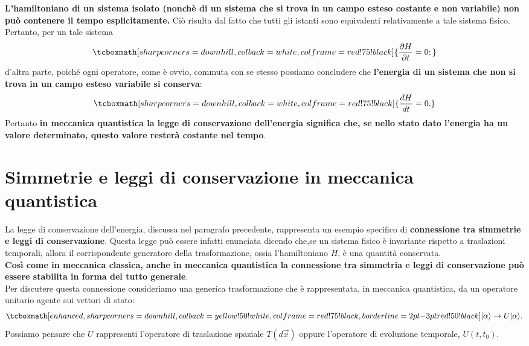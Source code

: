 \documentclass[a4paper,12pt,oneside]{book}
\begin{document}
\textbf{L'hamiltoniano di un sistema isolato (nonchè di un sistema che si trova in un campo esteso costante e non variabile) non può contenere il tempo esplicitamente.} Ciò risulta dal fatto che tutti gli istanti sono equivalenti relativamente a tale sistema fisico. Pertanto, per un tale sistema  
	\begin{equation}
		\tcboxmath[sharp corners=downhill, colback=white, colframe=red!75!black]{
			\frac{\partial H}{\partial{t}}=0;
			}
	\end{equation}
d'altra parte, poiché ogni operatore, come è ovvio, commuta con se stesso possiamo concludere che \textbf{l'energia di un sistema che non si trova in un campo esteso variabile si conserva}:
	\begin{equation}
		\tcboxmath[sharp corners=downhill, colback=white, colframe=red!75!black]{
			\frac{dH}{dt}=0.
			}
	\end{equation}
Pertanto \textbf{in meccanica quantistica la legge di conservazione dell'energia significa che, se nello stato dato l'energia ha un valore determinato, questo valore resterà costante nel tempo}.

\section[Simmetrie e leggi di conservazione  in meccanica quantistica]{Simmetrie e leggi di conservazione  in meccanica \\quantistica} 

La legge di conservazione dell'energia, discussa nel paragrafo precedente, rappresenta un esempio specifico di \textbf{connessione tra simmetrie e leggi di conservazione}. Questa legge può essere infatti enunciata dicendo che,se un sistema fisico è invariante rispetto a traslazioni temporali, allora il corrispondente generatore della trasformazione, ossia l'hamiltoniano $H$, è una quantità conservata.\\

\textbf{Così come in meccanica classica, anche in meccanica quantistica la connessione tra simmetria e leggi di conservazione può essere stabilita in forma del tutto generale}.\\

Per discutere questa connessione consideriamo una generica trasformazione che è rappresentata, in meccanica quantistica, da un operatore unitario agente sui vettori di stato:
	\begin{equation}
	\label{eq:cap12_3}
		\tcboxmath[enhanced, sharp corners=downhill, colback=yellow!50!white, colframe=red!75!black, borderline={2pt}{-3pt}{red!50!black}]{
			|\alpha \rangle \rightarrow {U}|\alpha \rangle.
			}
	\end{equation}
Possiamo pensare che ${U}$ rappresenti l'operatore di traslazione spaziale $T(d\vec{x})$ oppure l'operatore di evoluzione temporale, ${U}(t,t_0)$.\\
\end{document}
